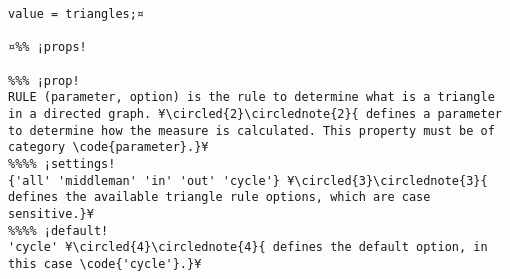 \documentclass{tufte-handout}
\begin{document}
\begin{lstlisting}
value = triangles;¤

¤%% ¡props!

%%% ¡prop! 
RULE (parameter, option) is the rule to determine what is a triangle in a directed graph. ¥\circled{2}\circlednote{2}{ defines a parameter to determine how the measure is calculated. This property must be of category \code{parameter}.}¥
%%%% ¡settings!
{'all' 'middleman' 'in' 'out' 'cycle'} ¥\circled{3}\circlednote{3}{ defines the available triangle rule options, which are case sensitive.}¥
%%%% ¡default!
'cycle' ¥\circled{4}\circlednote{4}{ defines the default option, in this case \code{'cycle'}.}¥
\end{lstlisting}

%
%
\end{document}
